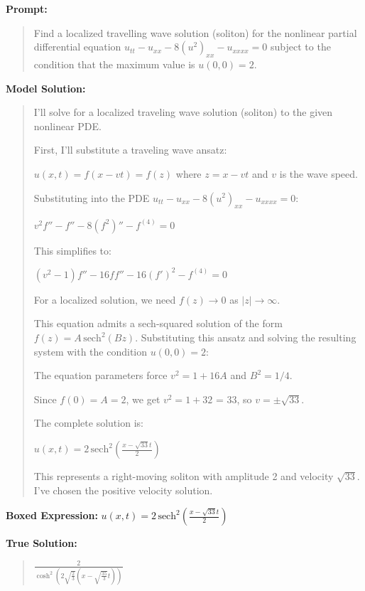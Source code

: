 \documentclass{article}
\begin{document}
\textbf{Prompt:}
\begin{quote}
Find a localized travelling wave solution (soliton) for the nonlinear partial differential equation $u_{tt} - u_{xx} - 8(u^2)_{xx} - u_{xxxx}=0$ subject to the condition that the maximum value is $u(0,0) = 2$.
\end{quote}
\textbf{Model Solution:}
\begin{quote}
I'll solve for a localized traveling wave solution (soliton) to the given nonlinear PDE.



First, I'll substitute a traveling wave ansatz:

$u(x,t) = f(x-vt) = f(z)$ where $z = x-vt$ and $v$ is the wave speed.



Substituting into the PDE $u_{tt} - u_{xx} - 8(u^2)_{xx} - u_{xxxx}=0$:

$v^2f'' - f'' - 8(f^2)'' - f^{(4)} = 0$



This simplifies to:

$(v^2-1)f'' - 16ff'' - 16(f')^2 - f^{(4)} = 0$



For a localized solution, we need $f(z) \to 0$ as $|z| \to \infty$.



This equation admits a sech-squared solution of the form $f(z) = A\,\text{sech}^2(Bz)$. Substituting this ansatz and solving the resulting system with the condition $u(0,0) = 2$:



The equation parameters force $v^2 = 1 + 16A$ and $B^2 = 1/4$.



Since $f(0) = A = 2$, we get $v^2 = 1 + 32$ = 33, so $v = \pm\sqrt{33}$.



The complete solution is:



$\boxed{u(x,t) = 2\,\text{sech}^2\left(\frac{x-\sqrt{33}t}{2}\right)}$



This represents a right-moving soliton with amplitude 2 and velocity $\sqrt{33}$. I've chosen the positive velocity solution.
\end{quote}
\textbf{Boxed Expression:} $u(x,t) = 2\,\text{sech}^2\left(\frac{x-\sqrt{33}t}{2}\right)$

\textbf{True Solution:}
\begin{quote}
$\frac{2}{\cosh^2(2\sqrt{\frac{2}{3}}(x-\sqrt{\frac{35}{3}}t))}$
\end{quote}
\end{document}
